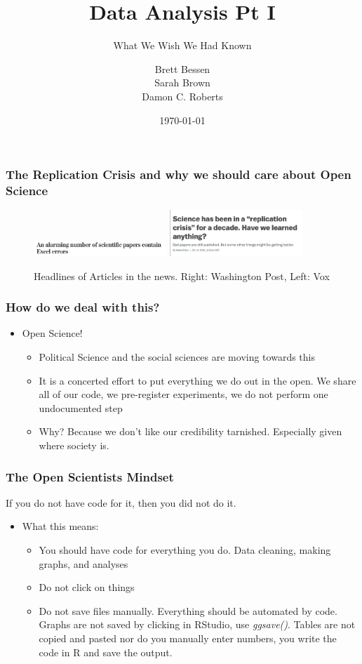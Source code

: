 \documentclass{beamer}
\title{Data Analysis Pt I}
\subtitle{What We Wish We Had Known}
\date{\today}
\author{Brett Bessen \\ Sarah Brown \\ Damon C. Roberts}
\begin{document}
	\begin{frame}
		\maketitle	
	\end{frame}
	\begin{frame}
		\frametitle{The Replication Crisis and why we should care about Open Science}
			\begin{figure}
				\includegraphics[width = 50mm]{wp.png}
				\hfill
				\includegraphics[width = 50mm]{vox.png}	
				\caption{Headlines of Articles in the news. Right: Washington Post, Left: Vox}
			\end{figure}
	\end{frame}
	\begin{frame}
		\frametitle{How do we deal with this?}
		\begin{itemize}
			\item Open Science!
			\begin{itemize}
				\item Political Science and the social sciences are moving towards this
				\item It is a concerted effort to put everything we do out in the open. We share all of our code, we pre-register experiments, we do not perform one undocumented step
				\item Why? Because we don't like our credibility tarnished. Especially given where society is.
			\end{itemize}
		\end{itemize}
	\end{frame}
	\begin{frame}
		\frametitle{The Open Scientists Mindset}
		If you do not have code for it, then you did not do it.
		\begin{itemize}
			\item What this means:
			\begin{itemize}
				\item You should have code for everything you do. Data cleaning, making graphs, and analyses
				\item Do not click on things
				\item Do not save files manually. Everything should be automated by code. Graphs are not saved by clicking in RStudio, use \textit{ggsave()}. Tables are not copied and pasted nor do you manually enter numbers, you write the code in R and save the output.
			\end{itemize}
		\end{itemize}
	\end{frame}
\end{document}
